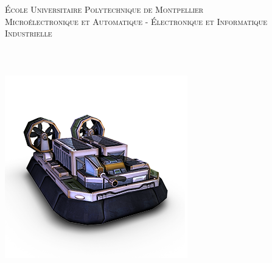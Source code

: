 \makeatletter
  \begin{titlepage}
  \centering
      {\Large \textsc{École Universitaire Polytechnique de Montpellier}}\\
      \textsc{Microélectronique et Automatique - Électronique et Informatique Industrielle }\\
    \noindent\hrulefill 
    \\
    \vspace{1.5cm}
      {\large	\@date\\}
    \vspace{1.5cm}
       {\huge \textbf{\@title}} \\
	
	\vspace{0.7cm}
      \includegraphics[scale=0.38]{head.png}\\

    \vspace{2em}
        {\large \@author} \\
    

\end{titlepage}
